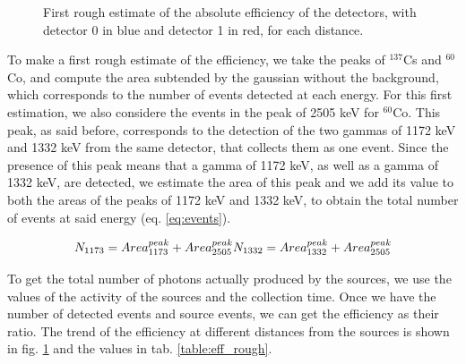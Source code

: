\begin{figure}[H]
\begin{minipage}[c]{0.35\linewidth}
	\end{minipage}
	\caption{First rough estimate of the absolute efficiency of the detectors, with detector 0 in blue and detector 1 in red, for each distance.}
    \label{fig:eff_rough}
	\end{figure}
 
To make a first rough estimate of the efficiency, we take the peaks of $^{137}$Cs and $^{60}$Co, and compute the area subtended by the gaussian without the background, which corresponds to the number of events detected at each energy. For this first estimation, we also considere the events in the peak of 2505 keV for $^{60}$Co. This peak, as said before, corresponds to the detection of the two gammas of 1172 keV and 1332 keV from the same detector, that collects them as one event. Since the presence of this peak means that a gamma of 1172 keV, as well as a gamma of 1332 keV, are detected, we estimate the area of this peak and we add its value to both the areas of the peaks of 1172 keV and 1332 keV, to obtain the total number of events at said energy (eq. \ref{eq:events}).

\begin{equation} \label{eq:events}
    \\ N_{1173}= Area_{1173}^{peak}+Area_{2505}^{peak} \\
    N_{1332}= Area_{1332}^{peak}+Area_{2505}^{peak}
\end{equation}

To get the total number of photons actually produced by the sources, we use the values of the activity of the sources and the collection time. Once we have the number of detected events and source events, we can get the efficiency as their ratio. The trend of the efficiency at different distances from the sources is shown in fig. \ref{fig:eff_rough} and the values in tab. \ref{table:eff_rough}.

